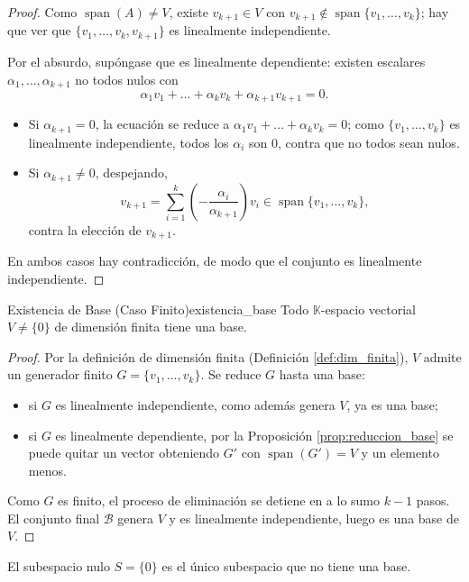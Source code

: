 \documentclass[11pt, a4paper]{article}
\begin{document}
\begin{proof}
Como $\operatorname{span}(A) \neq V$, existe $v_{k+1} \in V$ con $v_{k+1} \notin \operatorname{span}\{v_1, \dots, v_k\}$; hay que ver que $\{v_1, \dots, v_k, v_{k+1}\}$ es linealmente independiente.

Por el absurdo, supóngase que es linealmente dependiente: existen escalares $\alpha_1, \dots, \alpha_{k+1}$ no todos nulos con
\[
\alpha_1 v_1 + \dots + \alpha_k v_k + \alpha_{k+1} v_{k+1} = 0.
\]
\begin{itemize}
    \item Si $\alpha_{k+1} = 0$, la ecuación se reduce a $\alpha_1 v_1 + \dots + \alpha_k v_k = 0$; como $\{v_1, \dots, v_k\}$ es linealmente independiente, todos los $\alpha_i$ son $0$, contra que no todos sean nulos.
    \item Si $\alpha_{k+1} \neq 0$, despejando,
    \[
    v_{k+1} = \sum_{i=1}^k \left( -\frac{\alpha_i}{\alpha_{k+1}} \right) v_i \in \operatorname{span}\{v_1, \dots, v_k\},
    \]
    contra la elección de $v_{k+1}$.
\end{itemize}
En ambos casos hay contradicción, de modo que el conjunto es linealmente independiente.
\end{proof}

\begin{teorema}{Existencia de Base (Caso Finito)}{existencia_base}
Todo $\mathbb{K}$-espacio vectorial $V \neq \{0\}$ de dimensión finita tiene una base.
\end{teorema}

\begin{proof}
Por la definición de dimensión finita (Definición \ref{def:dim_finita}), $V$ admite un generador finito $G = \{v_1, \dots, v_k\}$. Se reduce $G$ hasta una base:
\begin{itemize}
    \item si $G$ es linealmente independiente, como además genera $V$, ya es una base;
    \item si $G$ es linealmente dependiente, por la Proposición \ref{prop:reduccion_base} se puede quitar un vector obteniendo $G'$ con $\operatorname{span}(G') = V$ y un elemento menos.
\end{itemize}
Como $G$ es finito, el proceso de eliminación se detiene en a lo sumo $k-1$ pasos. El conjunto final $\mathcal{B}$ genera $V$ y es linealmente independiente, luego es una base de $V$.
\end{proof}

\obs El subespacio nulo $S = \{0\}$ es el único subespacio que no tiene una base.
\end{document}
